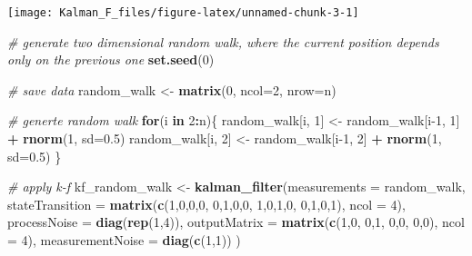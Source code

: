 \documentclass[
]{article}
\newenvironment{Shaded}{\begin{snugshade}}{\end{snugshade}}
\newcommand{\CommentTok}[1]{\textcolor[rgb]{0.56,0.35,0.01}{\textit{#1}}}
\newcommand{\ControlFlowTok}[1]{\textcolor[rgb]{0.13,0.29,0.53}{\textbf{#1}}}
\newcommand{\DataTypeTok}[1]{\textcolor[rgb]{0.13,0.29,0.53}{#1}}
\newcommand{\DecValTok}[1]{\textcolor[rgb]{0.00,0.00,0.81}{#1}}
\newcommand{\FloatTok}[1]{\textcolor[rgb]{0.00,0.00,0.81}{#1}}
\newcommand{\KeywordTok}[1]{\textcolor[rgb]{0.13,0.29,0.53}{\textbf{#1}}}
\newcommand{\NormalTok}[1]{#1}
\newcommand{\OperatorTok}[1]{\textcolor[rgb]{0.81,0.36,0.00}{\textbf{#1}}}
\newcommand{\StringTok}[1]{\textcolor[rgb]{0.31,0.60,0.02}{#1}}
\begin{document}
\begin{center}\texttt{[image: Kalman\_F\_files/figure-latex/unnamed-chunk-3-1]} \end{center}

\begin{Shaded}
\begin{Highlighting}[]
\CommentTok{# generate two dimensional random walk, where the current position depends only on the previous one}
\KeywordTok{set.seed}\NormalTok{(}\DecValTok{0}\NormalTok{)}

\CommentTok{# save data}
\NormalTok{random_walk <-}\StringTok{ }\KeywordTok{matrix}\NormalTok{(}\DecValTok{0}\NormalTok{, }\DataTypeTok{ncol=}\DecValTok{2}\NormalTok{, }\DataTypeTok{nrow=}\NormalTok{n)}

\CommentTok{# generte random walk}
\ControlFlowTok{for}\NormalTok{(i }\ControlFlowTok{in} \DecValTok{2}\OperatorTok{:}\NormalTok{n)\{}
\NormalTok{    random_walk[i, }\DecValTok{1}\NormalTok{] <-}\StringTok{ }\NormalTok{random_walk[i}\DecValTok{-1}\NormalTok{, }\DecValTok{1}\NormalTok{] }\OperatorTok{+}\StringTok{ }\KeywordTok{rnorm}\NormalTok{(}\DecValTok{1}\NormalTok{, }\DataTypeTok{sd=}\FloatTok{0.5}\NormalTok{)}
\NormalTok{    random_walk[i, }\DecValTok{2}\NormalTok{] <-}\StringTok{ }\NormalTok{random_walk[i}\DecValTok{-1}\NormalTok{, }\DecValTok{2}\NormalTok{] }\OperatorTok{+}\StringTok{ }\KeywordTok{rnorm}\NormalTok{(}\DecValTok{1}\NormalTok{, }\DataTypeTok{sd=}\FloatTok{0.5}\NormalTok{)}
\NormalTok{\}}

\CommentTok{# apply k-f}
\NormalTok{kf_random_walk <-}\StringTok{ }\KeywordTok{kalman_filter}\NormalTok{(}\DataTypeTok{measurements =}\NormalTok{ random_walk, }\DataTypeTok{stateTransition =} \KeywordTok{matrix}\NormalTok{(}\KeywordTok{c}\NormalTok{(}\DecValTok{1}\NormalTok{,}\DecValTok{0}\NormalTok{,}\DecValTok{0}\NormalTok{,}\DecValTok{0}\NormalTok{, }\DecValTok{0}\NormalTok{,}\DecValTok{1}\NormalTok{,}\DecValTok{0}\NormalTok{,}\DecValTok{0}\NormalTok{, }\DecValTok{1}\NormalTok{,}\DecValTok{0}\NormalTok{,}\DecValTok{1}\NormalTok{,}\DecValTok{0}\NormalTok{, }\DecValTok{0}\NormalTok{,}\DecValTok{1}\NormalTok{,}\DecValTok{0}\NormalTok{,}\DecValTok{1}\NormalTok{), }\DataTypeTok{ncol =} \DecValTok{4}\NormalTok{), }
    \DataTypeTok{processNoise =} \KeywordTok{diag}\NormalTok{(}\KeywordTok{rep}\NormalTok{(}\DecValTok{1}\NormalTok{,}\DecValTok{4}\NormalTok{)), }\DataTypeTok{outputMatrix =} \KeywordTok{matrix}\NormalTok{(}\KeywordTok{c}\NormalTok{(}\DecValTok{1}\NormalTok{,}\DecValTok{0}\NormalTok{, }\DecValTok{0}\NormalTok{,}\DecValTok{1}\NormalTok{, }\DecValTok{0}\NormalTok{,}\DecValTok{0}\NormalTok{, }\DecValTok{0}\NormalTok{,}\DecValTok{0}\NormalTok{), }\DataTypeTok{ncol =} \DecValTok{4}\NormalTok{),  }\DataTypeTok{measurementNoise =} \KeywordTok{diag}\NormalTok{(}\KeywordTok{c}\NormalTok{(}\DecValTok{1}\NormalTok{,}\DecValTok{1}\NormalTok{))}
\NormalTok{)}


\end{Highlighting}
\end{Shaded}
\end{document}
